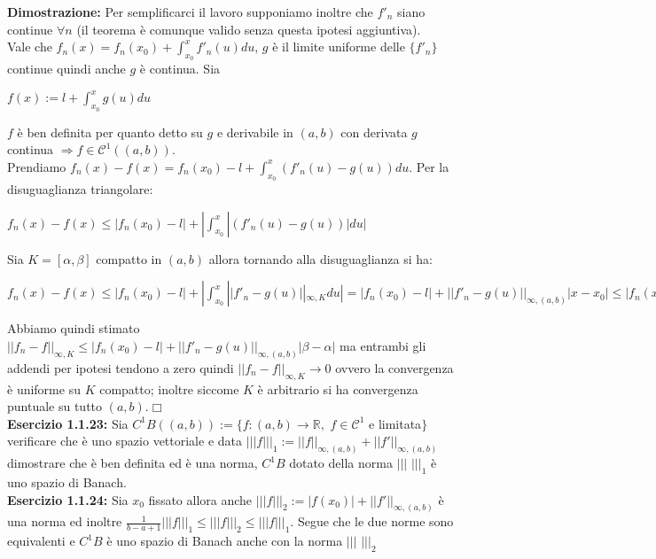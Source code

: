 \documentclass[a4paper,11pt,titlepage]{book}
\begin{document}
\textbf{Dimostrazione:} Per semplificarci il lavoro supponiamo inoltre che $f'_{n}$ siano continue $\forall{n}$ (il teorema è comunque valido senza questa ipotesi aggiuntiva).\\

Vale che $f_{n}(x)=f_{n}(x_0)+\int_{x_0}^{x}f'_{n}(u)du$, $g$ è il limite uniforme delle $\{f'_{n}\}$ continue quindi anche $g$ è continua. Sia 

\begin{center}
$f(x):=l+\int_{x_0}^{x}g(u)du$
\end{center}

$f$ è ben definita per quanto detto su $g$ e derivabile in $(a,b)$ con derivata $g$ continua $\Rightarrow f\in\mathcal{C}^1((a,b))$.\\

Prendiamo $f_{n}(x)-f(x)=f_{n}(x_0)-l+\int_{x_0}^{x}(f'_{n}(u)-g(u))du$. Per la disuguaglianza triangolare:

\begin{center}
$f_{n}(x)-f(x)\leq |f_{n}(x_0)-l|+|\int_{x_0}^{x}|(f'_{n}(u)-g(u))|du|$
\end{center}

Sia $K=[\alpha,\beta]$ compatto in $(a,b)$ allora tornando alla disuguaglianza si ha:
\begin{center}
$f_{n}(x)-f(x)\leq |f_{n}(x_0)-l|+|\int_{x_0}^{x}||f'_{n}-g(u)||_{\infty,K}du|=|f_{n}(x_0)-l|+||f'_{n}-g(u)||_{\infty,(a,b)}|x-x_0|\leq|f_{n}(x_0)-l|+||f'_{n}-g(u)||_{\infty,(a,b)}|\beta - \alpha|$\\
\end{center}

Abbiamo quindi stimato $||f_{n}-f||_{\infty,K}\leq|f_{n}(x_0)-l|+||f'_{n}-g(u)||_{\infty,(a,b)}|\beta - \alpha|$ ma entrambi gli addendi per ipotesi tendono a zero quindi $||f_{n}-f||_{\infty,K}\rightarrow 0$ ovvero la convergenza è uniforme su $K$ compatto; inoltre siccome $K$ è arbitrario si ha convergenza puntuale su tutto $(a,b)$.$\Box$\\

\textbf{Esercizio 1.1.23:} Sia $C^1B((a,b)):=\{f:(a,b)\rightarrow\mathbb{R},$  $f\in\mathcal{C}^1$ e limitata$\}$ verificare che è uno spazio vettoriale e data $|||f|||_1:=||f||_{\infty,(a,b)}+||f'||_{\infty,(a,b)}$ dimostrare che è ben definita ed è una norma, $C^1B$ dotato della norma $|||$ $|||_1$ è uno spazio di Banach.\\

\textbf{Esercizio 1.1.24:} Sia $x_0$ fissato allora anche $|||f|||_2:=|f(x_0)|+||f'||_{\infty,(a,b)}$ è una norma ed inoltre $\frac{1}{b-a+1}|||f|||_1\leq |||f|||_2 \leq |||f|||_1$. Segue che le due norme sono equivalenti e $C^1B$ è uno spazio di Banach anche con la norma $|||$ $|||_2$
\end{document}
